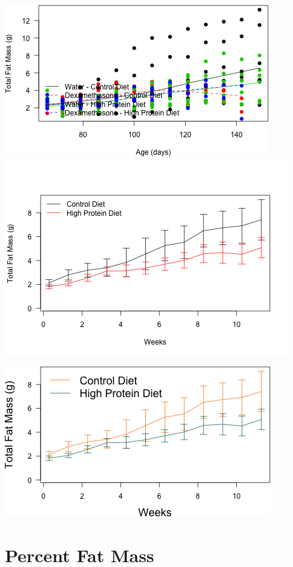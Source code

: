 \documentclass[]{article}
\begin{document}
\includegraphics{figures/fat-mass-scatterplot-1.png}
\includegraphics{figures/fat-mass-scatterplot-2.png}

\includegraphics{figures/hpd-fat-mass-scatterplot-uthsc-1.png}

\section{Percent Fat Mass}\label{percent-fat-mass}
\end{document}
